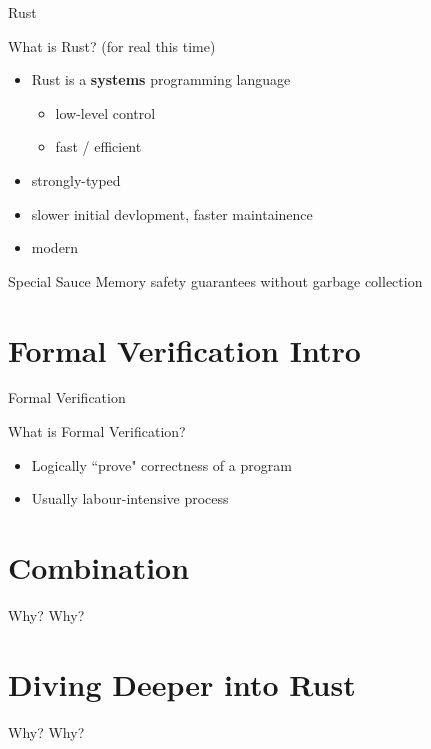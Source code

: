 \documentclass{beamer}
\begin{document}
\begin{frame}{Rust}
\begin{block}{What is Rust? (for real this time)}
\begin{itemize}
	\item Rust is a \textbf{systems} programming language
	\begin{itemize}
		\item low-level control
		\item fast / efficient
	\end{itemize}
	\item strongly-typed
	\item slower initial devlopment, faster maintainence
	\item modern
\end{itemize}
\end{block}
\begin{block}{Special Sauce} 
Memory safety guarantees without garbage collection
\end{block}
\end{frame}

\section{Formal Verification Intro}
\begin{frame}{Formal Verification}
\begin{block}{What is Formal Verification?}
\begin{itemize} 
\item Logically ``prove" correctness of a program
\item Usually labour-intensive process
\end{itemize} 
\end{block}
\end{frame}


\section{Combination}
\begin{frame}{Why?}
Why? 
\end{frame}

\section{Diving Deeper into Rust}
\begin{frame}{Why?}
Why? 
\end{frame}
\end{document}
